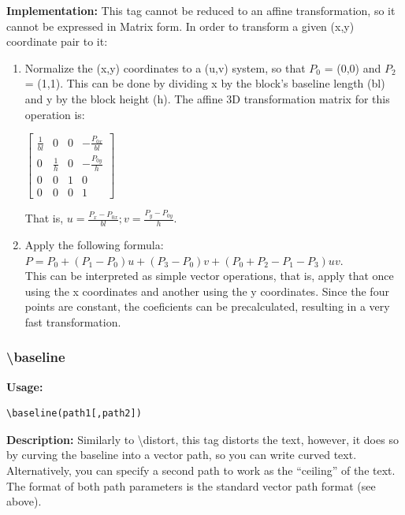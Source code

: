 \documentclass{spec}
\begin{document}
\textbf{Implementation:}
This tag cannot be reduced to an affine transformation, so it cannot be expressed in Matrix form.
In order to transform a given (x,y) coordinate pair to it:

\begin{enumerate}
\item Normalize the (x,y) coordinates to a (u,v) system, so that $P_0$ = (0,0) and $P_2$ = (1,1).
This can be done by dividing x by the block's baseline length (bl) and y by the block height (h).
The affine 3D transformation matrix for this operation is:\\
\begin{center}
$\displaystyle \begin{bmatrix}
\frac{1}{bl} & 0 & 0 & -\frac{P_{0x}}{bl} \\
0 & \frac{1}{h} & 0 & -\frac{P_{0y}}{h} \\
0 & 0 & 1 & 0 \\
0 & 0 & 0 & 1
\end{bmatrix}$
\end{center}
That is, $\displaystyle u = \frac{P_x - P_{0x}}{bl}; v = \frac{P_y - P_{0y}}{h}$.
\item Apply the following formula: $P = P_0 + (P_1-P_0) u + (P_3-P_0) v + (P_0+P_2-P_1-P_3) u v$.\\
This can be interpreted as simple vector operations, that is, apply that once using the x coordinates
and another using the y coordinates. Since the four points are constant, the coeficients can be
precalculated, resulting in a very fast transformation.\\
\end{enumerate}

\subsubsection{\textbackslash baseline}

\textbf{Usage:}
\begin{verbatim}
\baseline(path1[,path2])
\end{verbatim}

\textbf{Description:}
Similarly to \textbackslash distort, this tag distorts the text, however, it does so by curving the
baseline into a vector path, so you can write curved text. Alternatively, you can specify a second
path to work as the ``ceiling'' of the text. The format of both path parameters is the standard
vector path format (see above).
\end{document}
